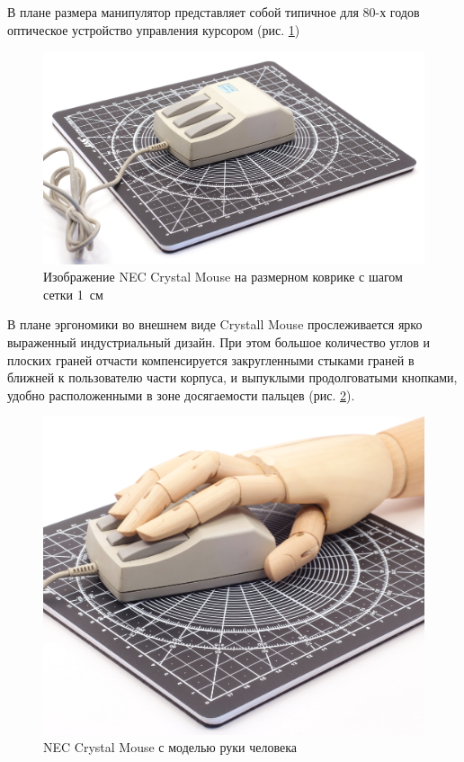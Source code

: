 \documentclass[11pt, a4paper]{article}
\begin{document}
В плане размера манипулятор представляет собой типичное для 80-х годов оптическое устройство управления курсором (рис. \ref{fig:NecCrystalSize})

\begin{figure}[h]
    \centering
    \includegraphics[scale=0.4]{1986_nec_crystal_mouse/NecKovrik_60.jpg}
    \caption{Изображение NEC Crystal Mouse на размерном коврике с шагом сетки 1~см}
    \label{fig:NecCrystalSize}
\end{figure}

В плане эргономики во внешнем виде Crystall Mouse прослеживается ярко выраженный индустриальный дизайн. При этом большое количество углов и плоских граней отчасти компенсируется закругленными стыками граней в ближней к пользователю части корпуса, и выпуклыми продолговатыми кнопками, удобно расположенными в зоне досягаемости пальцев (рис. \ref{fig:NecCrystalHand}).

\begin{figure}[h]
    \centering
    \includegraphics[scale=0.4]{1986_nec_crystal_mouse/NecRuka_30.jpg}
    \caption{NEC Crystal Mouse с моделью руки человека}
    \label{fig:NecCrystalHand}
\end{figure}
\end{document}
